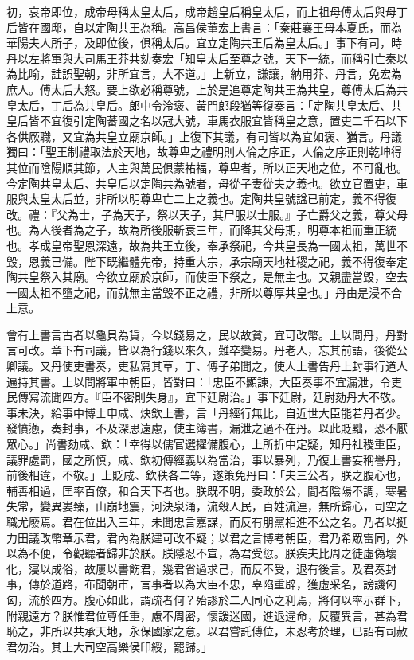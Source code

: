 \begin{pinyinscope}
初，哀帝即位，成帝母稱太皇太后，成帝趙皇后稱皇太后，而上祖母傅太后與母丁后皆在國邸，自以定陶共王為稱。高昌侯董宏上書言：「秦莊襄王母本夏氏，而為華陽夫人所子，及即位後，俱稱太后。宜立定陶共王后為皇太后。」事下有司，時丹以左將軍與大司馬王莽共劾奏宏「知皇太后至尊之號，天下一統，而稱引亡秦以為比喻，詿誤聖朝，非所宜言，大不道。」上新立，謙讓，納用莽、丹言，免宏為庶人。傅太后大怒。要上欲必稱尊號，上於是追尊定陶共王為共皇，尊傅太后為共皇太后，丁后為共皇后。郎中令泠褒、黃門郎段猶等復奏言：「定陶共皇太后、共皇后皆不宜復引定陶蕃國之名以冠大號，車馬衣服宜皆稱皇之意，置吏二千石以下各供厥職，又宜為共皇立廟京師。」上復下其議，有司皆以為宜如褒、猶言。丹議獨曰：「聖王制禮取法於天地，故尊卑之禮明則人倫之序正，人倫之序正則乾坤得其位而陰陽順其節，人主與萬民俱蒙祐福，尊卑者，所以正天地之位，不可亂也。今定陶共皇太后、共皇后以定陶共為號者，母從子妻從夫之義也。欲立官置吏，車服與太皇太后並，非所以明尊卑亡二上之義也。定陶共皇號諡已前定，義不得復改。禮：『父為士，子為天子，祭以天子，其尸服以士服。』子亡爵父之義，尊父母也。為人後者為之子，故為所後服斬衰三年，而降其父母期，明尊本祖而重正統也。孝成皇帝聖恩深遠，故為共王立後，奉承祭祀，今共皇長為一國太祖，萬世不毀，恩義已備。陛下既繼體先帝，持重大宗，承宗廟天地社稷之祀，義不得復奉定陶共皇祭入其廟。今欲立廟於京師，而使臣下祭之，是無主也。又親盡當毀，空去一國太祖不墮之祀，而就無主當毀不正之禮，非所以尊厚共皇也。」丹由是浸不合上意。

會有上書言古者以龜貝為貨，今以錢易之，民以故貧，宜可改幣。上以問丹，丹對言可改。章下有司議，皆以為行錢以來久，難卒變易。丹老人，忘其前語，後從公卿議。又丹使吏書奏，吏私寫其草，丁、傅子弟聞之，使人上書告丹上封事行道人遍持其書。上以問將軍中朝臣，皆對曰：「忠臣不顯諫，大臣奏事不宜漏泄，令吏民傳寫流聞四方。『臣不密則失身』，宜下廷尉治。」事下廷尉，廷尉劾丹大不敬。事未決，給事中博士申咸、炔欽上書，言「丹經行無比，自近世大臣能若丹者少。發憤懣，奏封事，不及深思遠慮，使主簿書，漏泄之過不在丹。以此貶黜，恐不厭眾心。」尚書劾咸、欽：「幸得以儒官選擢備腹心，上所折中定疑，知丹社稷重臣，議罪處罰，國之所慎，咸、欽初傅經義以為當治，事以暴列，乃復上書妄稱譽丹，前後相違，不敬。」上貶咸、欽秩各二等，遂策免丹曰：「夫三公者，朕之腹心也，輔善相過，匡率百僚，和合天下者也。朕既不明，委政於公，間者陰陽不調，寒暑失常，變異婁臻，山崩地震，河決泉涌，流殺人民，百姓流連，無所歸心，司空之職尤廢焉。君在位出入三年，未聞忠言嘉謀，而反有朋黨相進不公之名。乃者以挺力田議改幣章示君，君內為朕建可改不疑；以君之言博考朝臣，君乃希眾雷同，外以為不便，令觀聽者歸非於朕。朕隱忍不宣，為君受愆。朕疾夫比周之徒虛偽壞化，寖以成俗，故屢以書飭君，幾君省過求己，而反不受，退有後言。及君奏封事，傳於道路，布聞朝市，言事者以為大臣不忠，辜陷重辟，獲虛采名，謗譏匈匈，流於四方。腹心如此，謂疏者何？殆謬於二人同心之利焉，將何以率示群下，附親遠方？朕惟君位尊任重，慮不周密，懷諼迷國，進退違命，反覆異言，甚為君恥之，非所以共承天地，永保國家之意。以君嘗託傅位，未忍考於理，已詔有司赦君勿治。其上大司空高樂侯印綬，罷歸。」


\end{pinyinscope}
